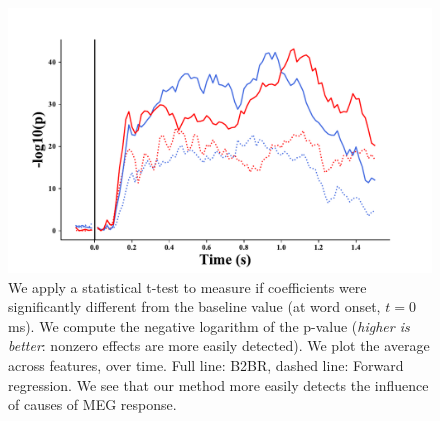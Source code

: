 \documentclass{article}
\begin{document}
\begin{figure}[h]
  \centering
  \includegraphics[width=\textwidth, trim=0cm 0cm 0cm 0cm]{figures/pvalues.pdf}
  \caption{We apply a statistical t-test to measure if coefficients were significantly different from the baseline value (at word onset, $t=0$ms).
  We compute the negative logarithm of the p-value (\textit{higher is better}: nonzero effects are more easily detected). We plot the average across features, over time.
  Full line: B2BR, dashed line: Forward regression. We see that our method more easily detects the influence of causes of MEG response.}
\end{figure}
\end{document}

